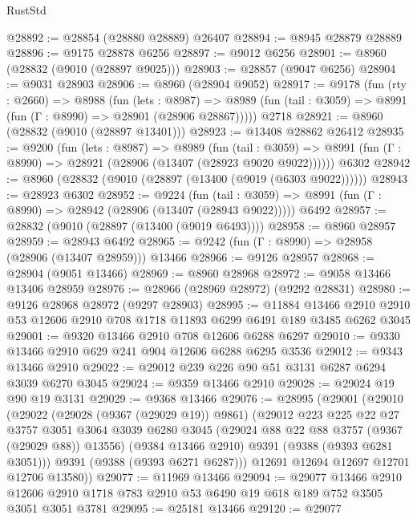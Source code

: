 \begin{lexlean}{RustStd}
\begin{coremodule}
@28892 := @28854 (@28880 @28889) @26407
@28894 := @8945 @28879 @28889
@28896 := @9175 @28878 @6256
@28897 := @9012 @6256
@28901 := @8960 (@28832 (@9010 (@28897 @9025)))
@28903 := @28857 (@9047 @6256)
@28904 := @9031 @28903
@28906 := @8960 (@28904 @9052)
@28917 := @9178
    (fun (rty : @2660) =>
    @8988
      (fun (lets : @8987) =>
      @8989 (fun (tail : @3059) => @8991 (fun (Γ : @8990) => @28901 (@28906 @28867)))))
    @2718
@28921 := @8960 (@28832 (@9010 (@28897 @13401)))
@28923 := @13408 @28862 @26412
@28935 := @9200
    (fun (lets : @8987) =>
    @8989
      (fun (tail : @3059) =>
      @8991 (fun (Γ : @8990) => @28921 (@28906 (@13407 (@28923 @9020 @9022))))))
    @6302
@28942 := @8960 (@28832 (@9010 (@28897 (@13400 (@9019 (@6303 @9022))))))
@28943 := @28923 @6302
@28952 := @9224
    (fun (tail : @3059) => @8991 (fun (Γ : @8990) => @28942 (@28906 (@13407 (@28943 @9022)))))
    @6492
@28957 := @28832 (@9010 (@28897 (@13400 (@9019 @6493))))
@28958 := @8960 @28957
@28959 := @28943 @6492
@28965 := @9242 (fun (Γ : @8990) => @28958 (@28906 (@13407 @28959))) @13466
@28966 := @9126 @28957
@28968 := @28904 (@9051 @13466)
@28969 := @8960 @28968
@28972 := @9058 @13466 @13406 @28959
@28976 := @28966 (@28969 @28972) (@9292 @28831)
@28980 := @9126 @28968 @28972 (@9297 @28903)
@28995 := @11884
    @13466
    @2910
    @2910
    @53
    @12606
    @2910
    @708
    @1718
    @11893
    @6299
    @6491
    @189
    @3485
    @6262
    @3045
@29001 := @9320 @13466 @2910 @708 @12606 @6288 @6297
@29010 := @9330 @13466 @2910 @629 @241 @904 @12606 @6288 @6295 @3536
@29012 := @9343 @13466 @2910
@29022 := @29012 @239 @226 @90 @51 @3131 @6287 @6294 @3039 @6270 @3045
@29024 := @9359 @13466 @2910
@29028 := @29024 @19 @90 @19 @3131
@29029 := @9368 @13466
@29076 := @28995
    (@29001
      (@29010
        (@29022
          (@29028 (@9367 (@29029 @19)) @9861)
          (@29012
            @223
            @225
            @22
            @27
            @3757
            @3051
            @3064
            @3039
            @6280
            @3045
            (@29024 @88 @22 @88 @3757 (@9367 (@29029 @88)) @13556)
            (@9384 @13466 @2910)
            @9391
            (@9388 (@9393 @6281 @3051)))
          @9391
          (@9388 (@9393 @6271 @6287)))
        @12691
        @12694
        @12697
        @12701
        @12706
        @13580))
@29077 := @11969 @13466
@29094 := @29077
    @13466
    @2910
    @12606
    @2910
    @1718
    @783
    @2910
    @53
    @6490
    @19
    @618
    @189
    @752
    @3505
    @3051
    @3051
    @3781
@29095 := @25181 @13466
@29120 := @29077

\end{coremodule}
\end{lexlean}
